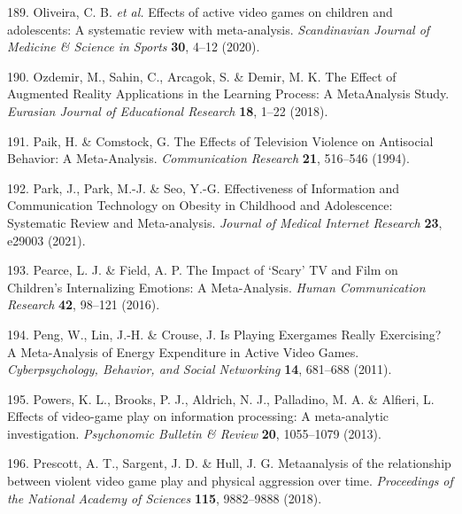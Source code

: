 \documentclass[
  english,
  man]{apa6}
\newenvironment{cslreferences}%
  {}%
  {\par}
\begin{document}
\begin{cslreferences}
\leavevmode\hypertarget{ref-oliveiraEffectsActiveVideo2020}{}%
189. Oliveira, C. B. \emph{et al.} Effects of active video games on children and adolescents: A systematic review with meta-analysis. \emph{Scandinavian Journal of Medicine \& Science in Sports} \textbf{30}, 4--12 (2020).

\leavevmode\hypertarget{ref-ozdemirEffectAugmentedReality2018}{}%
190. Ozdemir, M., Sahin, C., Arcagok, S. \& Demir, M. K. The Effect of Augmented Reality Applications in the Learning Process: A MetaAnalysis Study. \emph{Eurasian Journal of Educational Research} \textbf{18}, 1--22 (2018).

\leavevmode\hypertarget{ref-paikEffectsTelevisionViolence1994}{}%
191. Paik, H. \& Comstock, G. The Effects of Television Violence on Antisocial Behavior: A Meta-Analysis. \emph{Communication Research} \textbf{21}, 516--546 (1994).

\leavevmode\hypertarget{ref-parkEffectivenessInformationCommunication2021}{}%
192. Park, J., Park, M.-J. \& Seo, Y.-G. Effectiveness of Information and Communication Technology on Obesity in Childhood and Adolescence: Systematic Review and Meta-analysis. \emph{Journal of Medical Internet Research} \textbf{23}, e29003 (2021).

\leavevmode\hypertarget{ref-pearceImpactScaryTV2016}{}%
193. Pearce, L. J. \& Field, A. P. The Impact of `Scary' TV and Film on Children's Internalizing Emotions: A Meta-Analysis. \emph{Human Communication Research} \textbf{42}, 98--121 (2016).

\leavevmode\hypertarget{ref-pengPlayingExergamesReally2011}{}%
194. Peng, W., Lin, J.-H. \& Crouse, J. Is Playing Exergames Really Exercising? A Meta-Analysis of Energy Expenditure in Active Video Games. \emph{Cyberpsychology, Behavior, and Social Networking} \textbf{14}, 681--688 (2011).

\leavevmode\hypertarget{ref-powersEffectsVideogamePlay2013}{}%
195. Powers, K. L., Brooks, P. J., Aldrich, N. J., Palladino, M. A. \& Alfieri, L. Effects of video-game play on information processing: A meta-analytic investigation. \emph{Psychonomic Bulletin \& Review} \textbf{20}, 1055--1079 (2013).

\leavevmode\hypertarget{ref-prescottMetaanalysisRelationshipViolent2018}{}%
196. Prescott, A. T., Sargent, J. D. \& Hull, J. G. Metaanalysis of the relationship between violent video game play and physical aggression over time. \emph{Proceedings of the National Academy of Sciences} \textbf{115}, 9882--9888 (2018).


\end{cslreferences}
\end{document}
